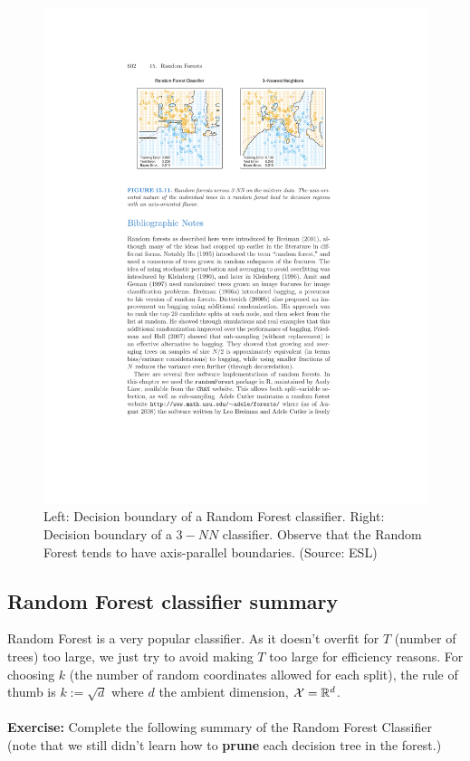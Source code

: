 \begin{figure}[H]
  \centering
  \includegraphics[width=5in]{rf_decision.pdf}
  \caption{Left: Decision boundary of a Random Forest classifier. Right:
  Decision boundary of a $3-NN$ classifier. Observe that the Random Forest tends
to have axis-parallel boundaries. (Source: ESL)}
\end{figure}

\subsection{Random Forest classifier summary}

Random Forest is a very popular classifier. As it doesn't overfit for $T$
(number of trees) too large, we just try to avoid making $T$ too large for
efficiency reasons. For choosing $k$ (the number of random coordinates allowed
for each split), the rule of thumb is $k:=\sqrt{d}$ where $d$ the ambient
  dimension, $\mathcal{X}=\mathbb{R}^d$. 
\\~\\
{\bf Exercise:} Complete the following summary of the Random Forest Classifier
(note that we still didn't learn how to {\bf prune} each decision tree in the forest.)

